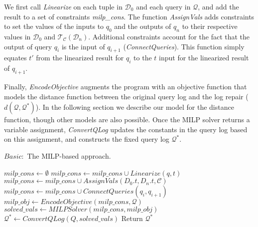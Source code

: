 We first call \textit{Linearize} on each tuple in $\mathcal{D}_0$ and
each query in $\mathcal{Q}$, and add the result to a set of
constraints \textit{milp\_cons}. The function \textit{AssignVals} adds
constraints to set the values of the inputs to $q_0$ and the outputs
of $q_n$ to their respective values in $\mathcal{D}_0$ and
$\mathcal{T}_\mathcal{C}(\mathcal{D}_n)$. Additional constraints
account for the fact that the output of query $q_i$ is the input of
$q_{i+1}$ (\textit{ConnectQueries}). This function simply equates $t'$
from the linearized result for $q_i$ to the $t$ input for the
linearized result of $q_{i+1}$.

Finally, \emph{EncodeObjective} augments the program with an objective
function that models the distance function between the original query
log and the log repair ($d(\mathcal{Q},\mathcal{Q}^*)$). In the
following section we describe our model for the distance function,
though other models are also possible. Once the MILP solver returns a
variable assignment, \textit{ConvertQLog} updates the constants in the
query log based on this assignment, and constructs the fixed query log
$\mathcal{Q}^*$.





\begin{algorithm}[t]
\caption{$Basic:$ The MILP-based approach.}
\label{alg:basic}
\scriptsize
\begin{algorithmic}[1]
\STATE $milp\_cons \leftarrow \emptyset$
\STATE $milp\_cons \leftarrow milp\_cons \cup Linearize(q, t)$
\ENDFOR
\STATE $milp\_cons \leftarrow milp\_cons \cup AssignVals(D_0.t, D_n.t, \mathcal{C})$
\STATE $milp\_cons \leftarrow milp\_cons \cup ConnectQueries(q_i, q_{i+1})$
\ENDFOR
\ENDFOR 
\STATE $milp\_obj \leftarrow EncodeObjective(milp\_cons, \mathcal{Q})$
\STATE $solved\_vals \leftarrow MILPSolver(milp\_cons, milp\_obj)$
\STATE $\mathcal{Q}^* \leftarrow ConvertQLog(Q, solved\_vals)$
\STATE Return $\mathcal{Q}^*$
\end{algorithmic}
\end{algorithm}



















